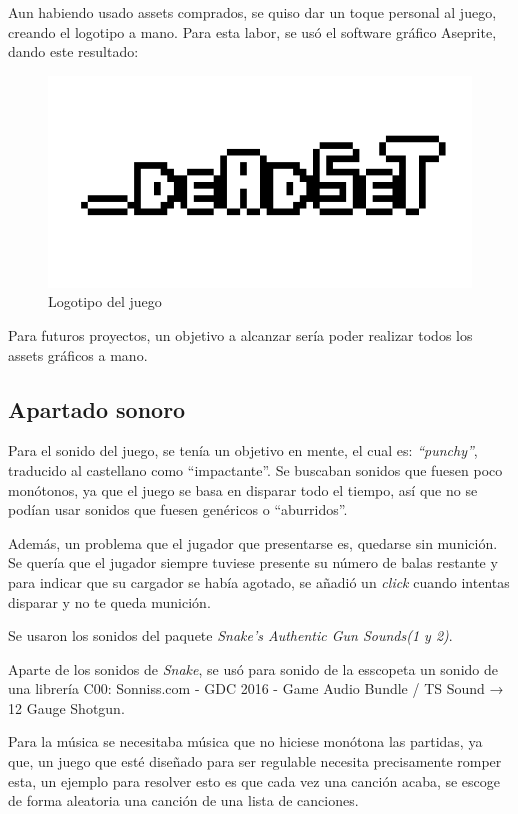 \documentclass[12pt]{article}
\begin{document}
        Aun habiendo usado assets comprados, se quiso dar un toque personal al juego, creando el logotipo a mano. Para esta labor, se usó el software gráfico Aseprite, dando este resultado:
        \begin{figure}[H]
            \centering
            \includegraphics[scale = 0.5]{Images/logo_big.png}
            \caption{Logotipo del juego}
            
        \end{figure}
        
        Para futuros proyectos, un objetivo a alcanzar sería poder realizar todos los assets gráficos a mano.
    
    \subsection{Apartado sonoro}
        
        Para el sonido del juego, se tenía un objetivo en mente, el cual es: \textit{“punchy”}, traducido al castellano como “impactante”. Se buscaban sonidos que fuesen poco monótonos, ya que el juego se basa en disparar todo el tiempo, así que no se podían usar sonidos que fuesen genéricos o “aburridos”. 

        Además, un problema que el jugador que presentarse es, quedarse sin munición. Se quería que el jugador siempre tuviese presente su número de balas restante y para indicar que su cargador se había agotado, se añadió un \textit{click} cuando intentas disparar y no te queda munición. 
        
        Se usaron los sonidos del paquete \textit{Snake's Authentic Gun Sounds(1 y 2)}.
        
        Aparte de los sonidos de \textit{Snake}, se usó para sonido de la esscopeta un sonido de una librería C00: Sonniss.com - GDC 2016 - Game Audio Bundle / TS Sound → 12 Gauge Shotgun.
        
        Para la música se necesitaba música que no hiciese monótona las partidas, ya que, un juego que esté diseñado para ser regulable necesita precisamente romper esta, un ejemplo para resolver esto es que cada vez una canción acaba, se escoge de forma aleatoria una canción de una lista de canciones. 
        
\end{document}
